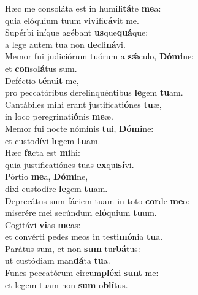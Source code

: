 \evenverse Hæc me consoláta est in humili\textbf{tá}te \textbf{me}a:~\*\\
\evenverse quia elóquium tuum vi\textbf{vi}fi\textbf{cá}vit me.\\
\oddverse Supérbi iníque agébant \textbf{us}que\textbf{quá}que:~\*\\
\oddverse a lege autem tua non \textbf{de}cli\textbf{ná}vi.\\
\evenverse Memor fui judiciórum tuórum a \textbf{sǽ}culo, \textbf{Dó}\textbf{mi}ne:~\*\\
\evenverse et \textbf{con}so\textbf{lá}tus sum.\\
\oddverse Deféctio \textbf{té}nu\textbf{it} me,~\*\\
\oddverse pro peccatóribus derelinquéntibus \textbf{le}gem \textbf{tu}am.\\
\evenverse Cantábiles mihi erant justificati\textbf{ó}nes \textbf{tu}æ,~\*\\
\evenverse in loco peregrinati\textbf{ó}nis \textbf{me}æ.\\
\oddverse Memor fui nocte nóminis \textbf{tu}i, \textbf{Dó}\textbf{mi}ne:~\*\\
\oddverse et custodívi \textbf{le}gem \textbf{tu}am.\\
\evenverse Hæc \textbf{fa}cta est \textbf{mi}hi:~\*\\
\evenverse quia justificatiónes tuas \textbf{ex}qui\textbf{sí}vi.\\
\oddverse Pórtio \textbf{me}a, \textbf{Dó}\textbf{mi}ne,~\*\\
\oddverse dixi custodíre \textbf{le}gem \textbf{tu}am.\\
\evenverse Deprecátus sum fáciem tuam in toto \textbf{cor}de \textbf{me}o:~\*\\
\evenverse miserére mei secúndum e\textbf{ló}quium \textbf{tu}um.\\
\oddverse Cogitávi \textbf{vi}as \textbf{me}as:~\*\\
\oddverse et convérti pedes meos in testi\textbf{mó}nia \textbf{tu}a.\\
\evenverse Parátus sum, et non \textbf{sum} tur\textbf{bá}tus:~\*\\
\evenverse ut custódiam man\textbf{dá}ta \textbf{tu}a.\\
\oddverse Funes peccatórum circum\textbf{plé}xi \textbf{sunt} me:~\*\\
\oddverse et legem tuam non \textbf{sum} o\textbf{blí}tus.\\
